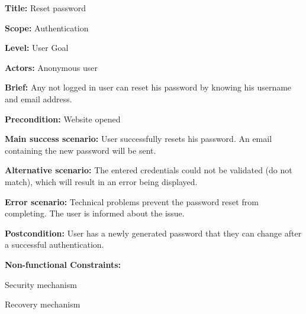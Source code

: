 
\begin{DoxyItemize}
\item {\bfseries{Title\+:}} Reset password
\item {\bfseries{Scope\+:}} Authentication
\item {\bfseries{Level\+:}} User Goal
\item {\bfseries{Actors\+:}} Anonymous user
\item {\bfseries{Brief\+:}} Any not logged in user can reset his password by knowing his username and email address.
\end{DoxyItemize}


\begin{DoxyItemize}
\item {\bfseries{Precondition\+:}} Website opened
\item {\bfseries{Main success scenario\+:}} User successfully resets his password. An email containing the new password will be sent.
\item {\bfseries{Alternative scenario\+:}} The entered credentials could not be validated (do not match), which will result in an error being displayed.
\item {\bfseries{Error scenario\+:}} Technical problems prevent the password reset from completing. The user is informed about the issue.
\item {\bfseries{Postcondition\+:}} User has a newly generated password that they can change after a successful authentication.
\item {\bfseries{Non-\/functional Constraints\+:}}
\begin{DoxyItemize}
\item Security mechanism
\item Recovery mechanism 
\end{DoxyItemize}
\end{DoxyItemize}